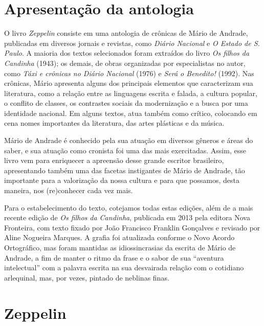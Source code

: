 \chapter[Apresentação da antologia \bigskip]{Apresentação da antologia}

O livro \emph{Zeppelin} consiste em uma antologia de crônicas de
Mário de Andrade, publicadas em diversos jornais e revistas, como
\emph{Diário Nacional} e \emph{O Estado de S. Paulo}. A maioria dos
textos selecionados foram extraídos do livro \emph{Os filhos da
Candinha} (1943); os demais, de obras organizadas por especialistas no
autor, como \emph{Táxi e crônicas no Diário Nacional} (1976) e
\emph{Será o Benedito!} (1992). Nas crônicas, Mário apresenta alguns dos
principais elementos que caracterizam sua literatura, como a relação
entre as linguagens escrita e falada, a cultura popular, o conflito de
classes, os contrastes sociais da modernização e a busca por uma
identidade nacional. Em alguns textos, atua também como crítico,
colocando em cena nomes importantes da literatura, das artes plásticas e
da música.

Mário de Andrade é conhecido pela sua atuação em diversos gêneros e
áreas do saber, e sua atuação como cronista foi uma das mais
exercitadas. Assim, esse livro vem para enriquecer a apreensão
desse grande escritor brasileiro,
apresentando também uma das facetas instigantes de Mário de Andrade,
tão importante para a valorização da nossa cultura e para
que possamos, desta maneira, nos (re)conhecer cada vez mais.

Para o estabelecimento do texto, cotejamos todas estas edições, além de
a mais recente edição de \emph{Os filhos da Candinha}, publicada em 2013
pela editora Nova Fronteira, com texto fixado por João Francisco
Franklin Gonçalves e revisado por Aline Nogueira Marques. A grafia foi
atualizada conforme o Novo Acordo Ortográfico, mas foram mantidas as
idiossincrasias da escrita de Mário de Andrade, a fim de manter o ritmo
da frase e o sabor de sua ``aventura intelectual'' com a palavra escrita
na sua desvairada relação com o cotidiano arlequinal, mas, por vezes,
pintado de neblinas finas.


\chapter{Zeppelin}

